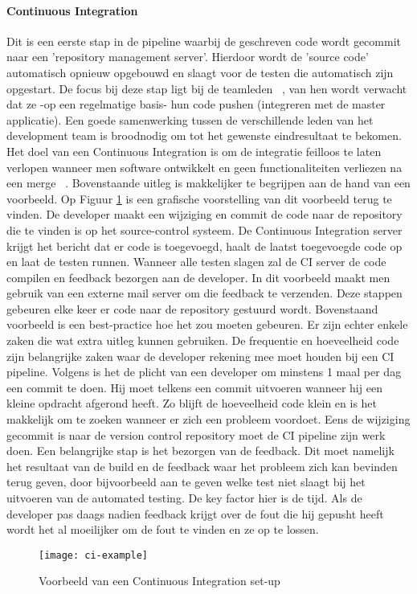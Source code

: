 
    \paragraph{Continuous Integration}
    Dit is een eerste stap in de pipeline waarbij de geschreven code wordt gecommit naar een 'repository management server'. Hierdoor wordt de 'source code' automatisch opnieuw opgebouwd en slaagt voor de testen die automatisch zijn opgestart. De focus bij deze stap ligt bij de teamleden ~\autocite{Fowler2006}, van hen wordt verwacht dat ze -op een regelmatige basis- hun code pushen (integreren met de master applicatie). Een goede samenwerking tussen de verschillende leden van het development team is broodnodig om tot het gewenste eindresultaat te bekomen.
    Het doel van een Continuous Integration is om de integratie feilloos te laten verlopen wanneer men software ontwikkelt en geen functionaliteiten verliezen na een merge ~\autocite{Riti2018}.
    \newline
    Bovenstaande uitleg is makkelijker te begrijpen aan de hand van een voorbeeld. Op Figuur \ref{img-ci-example} is een grafische voorstelling van dit voorbeeld terug te vinden.
    De developer maakt een wijziging en commit de code naar de repository die te vinden is op het source-control systeem. De Continuous Integration server krijgt het bericht dat er code is toegevoegd, haalt de laatst toegevoegde code op en laat de testen runnen. Wanneer alle testen slagen zal de CI server de code compilen en feedback bezorgen aan de developer. In dit voorbeeld maakt men gebruik van een externe mail server om die feedback te verzenden.
    Deze stappen gebeuren elke keer er code naar de repository gestuurd wordt.
    Bovenstaand voorbeeld is een best-practice hoe het zou moeten gebeuren. Er zijn echter enkele zaken die wat extra uitleg kunnen gebruiken.
    De frequentie en hoeveelheid code zijn belangrijke zaken waar de developer rekening mee moet houden bij een CI pipeline. Volgens \textcite{Fowler2006} is het de plicht van een developer om minstens 1 maal per dag een commit te doen. Hij moet telkens een commit uitvoeren wanneer hij een kleine opdracht afgerond heeft. Zo blijft de hoeveelheid code klein en is het makkelijk om te zoeken wanneer er zich een probleem voordoet.
    Eens de wijziging gecommit is naar de version control repository moet de CI pipeline zijn werk doen. Een belangrijke stap is het bezorgen van de feedback. Dit moet namelijk het resultaat van de build en de feedback waar het probleem zich kan bevinden terug geven, door bijvoorbeeld aan te geven welke test niet slaagt bij het uitvoeren van de automated testing. De key factor hier is de tijd. Als de developer pas daags nadien feedback krijgt over de fout die hij gepusht heeft wordt het al moeilijker om de fout te vinden en ze op te lossen. 
    \begin{figure}	
        \texttt{[image: ci-example]}
        \caption{Voorbeeld van een Continuous Integration set-up ~\autocite{Riti2018}} \label{img-ci-example}
    \end{figure}

